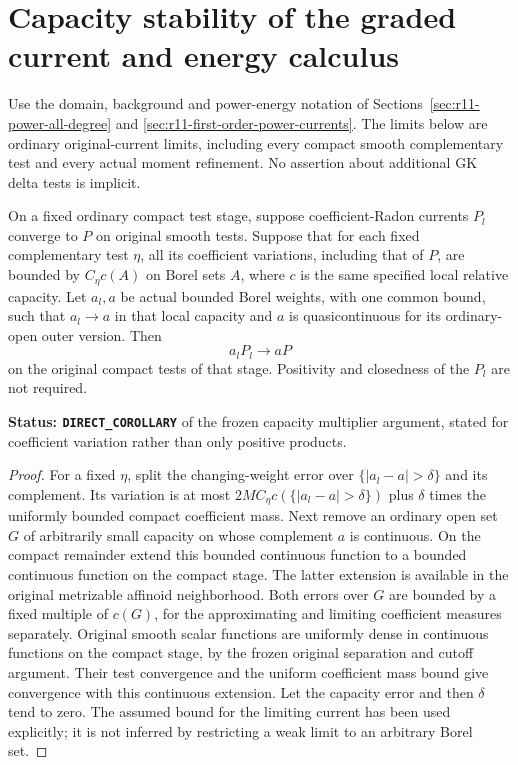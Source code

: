 \section{Capacity stability of the graded current and energy calculus}
\label{sec:r11-graded-capacity-stability}

Use the domain, background and power-energy notation of
Sections~\ref{sec:r11-power-all-degree} and
\ref{sec:r11-first-order-power-currents}.
The limits below are ordinary original-current limits,
including every compact smooth complementary test and
every actual moment refinement. No assertion about
additional GK delta tests is implicit.

\begin{lemma}
\label{lem:r11-general-coefficient-capacity-multiplier}
On a fixed ordinary compact test stage, suppose
coefficient-Radon currents $P_l$ converge to $P$ on
original smooth tests. Suppose that for each fixed
complementary test $\eta$, all its coefficient variations,
including that of $P$, are bounded by $C_\eta c(A)$ on
Borel sets $A$, where $c$ is the same specified local
relative capacity. Let $a_l,a$ be actual bounded Borel
weights, with one common bound, such that $a_l\to a$ in
that local capacity and $a$ is quasicontinuous for its
ordinary-open outer version. Then
\[
                         a_lP_l\longrightarrow aP
 \tag{GS1}
\]
on the original compact tests of that stage.
Positivity and closedness of the $P_l$ are not required.
\end{lemma}

\noindent\textbf{Status: \texttt{DIRECT\_COROLLARY}} of
the frozen capacity multiplier argument, stated for
coefficient variation rather than only positive products.

\begin{proof}
For a fixed $\eta$, split the changing-weight error over
$\{|a_l-a|>\delta\}$ and its complement. Its variation
is at most
$2M C_\eta c(\{|a_l-a|>\delta\})$ plus $\delta$ times
the uniformly bounded compact coefficient mass.
Next remove an ordinary open set $G$ of arbitrarily small
capacity on whose complement $a$ is continuous.
On the compact remainder extend this bounded continuous
function to a bounded continuous function on the compact
stage. The latter extension is available in the original
metrizable affinoid neighborhood. Both errors over $G$
are bounded by a fixed multiple of $c(G)$, for the
approximating and limiting coefficient measures separately.
Original smooth scalar functions are uniformly dense in
continuous functions on the compact stage, by the frozen
original separation and cutoff argument. Their test
convergence and the uniform coefficient mass bound give
convergence with this continuous extension. Let the
capacity error and then $\delta$ tend to zero.
The assumed bound for the limiting current has been used
explicitly; it is not inferred by restricting a weak
limit to an arbitrary Borel set.
\end{proof}

